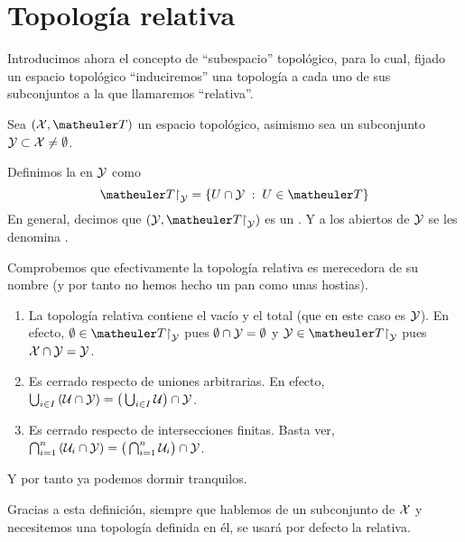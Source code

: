 \section{Topología relativa}
Introducimos ahora el concepto de ``subespacio'' topológico, para lo cual, fijado un espacio topológico ``induciremos'' una topología a cada uno de sus subconjuntos a la que llamaremos ``relativa''.
\begin{defi}
	Sea $(\X,\T)$ un espacio topológico, asimismo sea un subconjunto $\mathcal{Y}\subset\mathcal{X} \neq \emptyset$.
	
	Definimos la  en $\mathcal{Y}$ como \begin{equation}
		\T\restriction_\mc{Y} = \{U\cap\mc{Y}\midc U\in\T\}
	\end{equation}
	En general, decimos que $(\mc{Y},\T\restriction_\mc{Y})$ es un . Y a los abiertos de $\mathcal{Y}$ se les denomina .
\end{defi}
\begin{obs}
	Comprobemos que efectivamente la topología relativa es merecedora de su nombre (y por tanto no hemos hecho un pan como unas hostias).
	\begin{enumerate}
		\item La topología relativa contiene el vacío y el total (que en este caso es $\mathcal{Y}$). En efecto, $\emptyset \in \T\restriction_\mc{Y}$ pues $\emptyset \cap \mathcal{Y} = \emptyset$ y $\mc{Y} \in \T\restriction_\mc{Y}$ pues $\mathcal{X} \cap \mathcal{Y} = \mathcal{Y}$.
		\item Es cerrado respecto de uniones arbitrarias. En efecto, $\bigcup_{i \in I}{(\mathcal{U} \cap \mathcal{Y})} = \big( \bigcup_{i \in I} \mathcal{U} \big) \cap \mathcal{Y}$.
		\item Es cerrado respecto de intersecciones finitas. Basta ver, $\bigcap_{i = 1}^{n}{(\mathcal{U}_i \cap \mathcal{Y})} = \big( \bigcap_{i=1}^{n} \mathcal{U}_i \big) \cap \mathcal{Y}$.
	\end{enumerate}
	Y por tanto ya podemos dormir tranquilos.
\end{obs}

Gracias a esta definición, siempre que hablemos de un subconjunto de $\mathcal{X}$ y necesitemos una topología definida en él, se usará por defecto la relativa.

